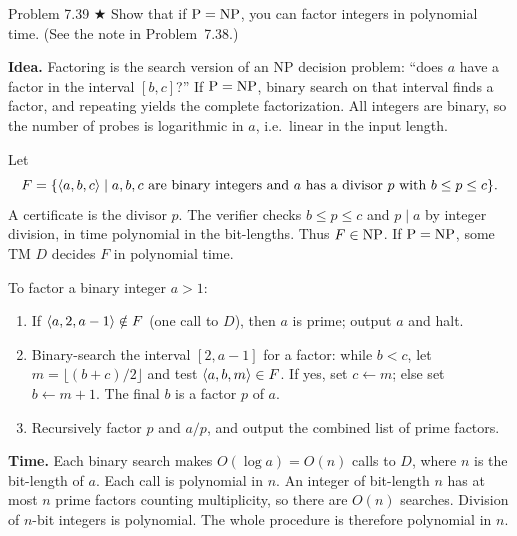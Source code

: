 \begin{question}{Problem 7.39 $\bigstar$}
Show that if $\mathrm{P}=\mathrm{NP}$, you can factor integers in polynomial time. (See the note in Problem~7.38.)
\end{question}
\begin{soln}
\textbf{Idea.} Factoring is the search version of an NP decision problem: ``does $a$ have a factor in the interval $[b,c]$?'' If $\mathrm{P}=\mathrm{NP}$, binary search on that interval finds a factor, and repeating yields the complete factorization. All integers are binary, so the number of probes is logarithmic in $a$, i.e.\ linear in the input length.

Let
\[
F=\{\langle a,b,c\rangle\mid a,b,c\text{ are binary integers and $a$ has a divisor $p$ with }b\le p\le c\}.
\]
A certificate is the divisor $p$. The verifier checks $b\le p\le c$ and $p\mid a$ by integer division, in time polynomial in the bit-lengths. Thus $F\in\mathrm{NP}$. If $\mathrm{P}=\mathrm{NP}$, some TM $D$ decides $F$ in polynomial time.

To factor a binary integer $a>1$:
\begin{enumerate}
\item If $\langle a,2,a-1\rangle\notin F$ (one call to $D$), then $a$ is prime; output $a$ and halt.
\item Binary-search the interval $[2,a-1]$ for a factor: while $b<c$, let $m=\lfloor(b+c)/2\rfloor$ and test $\langle a,b,m\rangle\in F$. If yes, set $c\leftarrow m$; else set $b\leftarrow m+1$. The final $b$ is a factor $p$ of $a$.
\item Recursively factor $p$ and $a/p$, and output the combined list of prime factors.
\end{enumerate}

\textbf{Time.}
Each binary search makes $O(\log a)=O(n)$ calls to $D$, where $n$ is the bit-length of $a$. Each call is polynomial in $n$. An integer of bit-length $n$ has at most $n$ prime factors counting multiplicity, so there are $O(n)$ searches. Division of $n$-bit integers is polynomial. The whole procedure is therefore polynomial in $n$.
\end{soln}

